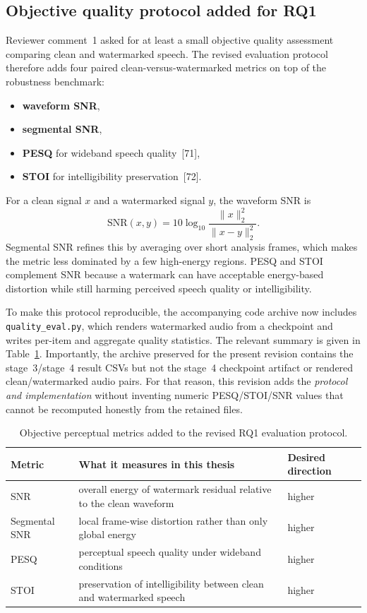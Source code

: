 \subsection{Objective quality protocol added for RQ1}
Reviewer comment~1 asked for at least a small objective quality assessment comparing clean and watermarked speech. The revised evaluation protocol therefore adds four paired clean-versus-watermarked metrics on top of the robustness benchmark:
\begin{itemize}[leftmargin=1.25em]
  \item \textbf{waveform SNR},
  \item \textbf{segmental SNR},
  \item \textbf{PESQ} for wideband speech quality~[71],
  \item \textbf{STOI} for intelligibility preservation~[72].
\end{itemize}
For a clean signal $x$ and a watermarked signal $y$, the waveform SNR is
\begin{equation}
  \mathrm{SNR}(x,y) = 10 \log_{10}\frac{\|x\|_2^2}{\|x-y\|_2^2}.
\end{equation}
Segmental SNR refines this by averaging over short analysis frames, which makes the metric less dominated by a few high-energy regions. PESQ and STOI complement SNR because a watermark can have acceptable energy-based distortion while still harming perceived speech quality or intelligibility.

To make this protocol reproducible, the accompanying code archive now includes \texttt{quality\_eval.py}, which renders watermarked audio from a checkpoint and writes per-item and aggregate quality statistics. The relevant summary is given in Table~\ref{tab:rq1_quality_metrics}. Importantly, the archive preserved for the present revision contains the stage~3/stage~4 result CSVs but not the stage~4 checkpoint artifact or rendered clean/watermarked audio pairs. For that reason, this revision adds the \emph{protocol and implementation} without inventing numeric PESQ/STOI/SNR values that cannot be recomputed honestly from the retained files.

\begin{table}[H]
\centering
\caption{Objective perceptual metrics added to the revised RQ1 evaluation protocol.}
\label{tab:rq1_quality_metrics}
\begin{tabular}{p{2.6cm}p{7.1cm}p{2.1cm}}
\toprule
\textbf{Metric} & \textbf{What it measures in this thesis} & \textbf{Desired direction} \\
\midrule
SNR & overall energy of watermark residual relative to the clean waveform & higher \\
Segmental SNR & local frame-wise distortion rather than only global energy & higher \\
PESQ & perceptual speech quality under wideband conditions & higher \\
STOI & preservation of intelligibility between clean and watermarked speech & higher \\
\bottomrule
\end{tabular}
\end{table}

